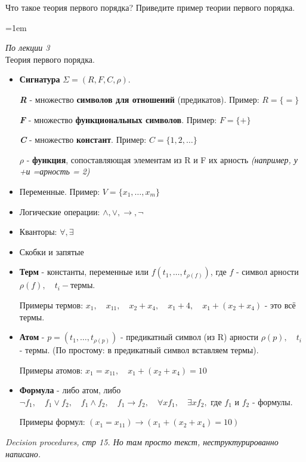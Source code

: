 \documentclass[12pt]{extreport}
\theoremstyle{definiton}
\theoremstyle{definition}
\theoremstyle{definition}
\newcommand{\solution}[2][\color{myblue}Ответ]{
\medskip
	\noindent{\bfseries #1 }{{\color{myblue}\bfseries #2:}}
}
\newenvironment{blockquote}{%
  \par%
  \medskip
  \leftskip=1em%
  \noindent}{%
  \par\medskip}
\begin{document}
\Pr[\textcolor{mygreen}{Каринэ, DONE}] Что такое теория первого порядка? Приведите пример теории первого порядка.
			
\solution{6}
\begin{blockquote}
{\color{myblue}
\textcolor{mypurpur}{\textit{По лекции 3}}\\

\noindent Теория первого порядка.
\begin{itemize}
    \item \textbf{Сигнатура} \(\Sigma=(R,F,C,\rho)\). \par
          \textbf{\textit{R}} - множество \textbf{символов для отношений} (предикатов). Пример: \(R=\{=\}\) \par
          \textbf{\textit{F}} - множество \textbf{функциональных символов}. Пример: \(F=\{+\}\) \par
          \textbf{\textit{C}} - множество \textbf{констант}. Пример: \(C=\{1,2,\dots\}\)\par
          \(\rho\) - \textbf{функция}, сопоставляющая элементам из R и F их арность \textit{(например, у \glqq+\grqq\quad и \glqq=\grqq\quad арность = 2)}
    \item Переменные. Пример: \(V=\{x_1,\dots,x_m\}\) 
    \item Логические операции: \(\wedge, \vee, \rightarrow, \neg \) 
    \item Кванторы: \(\forall, \exists\) 
    \item Скобки и запятые 
    \item \textbf{Терм} - константы, переменные или \(f(t_1, \dots, t_{\rho(f)})\), где \(f\) - символ арности \(\rho(f),  \quad t_i - \)термы. \par Примеры термов: \(x_1,\quad x_{11},\quad x_2+x_4, \quad x_1+4,\quad x_1+(x_2+x_4)\) - это всё термы.  
    \item \textbf{Атом} - \(p=(t_1, \dots, t_{\rho(p)})\) - предикатный символ (из R) арности \(\rho(p), \quad t_i\) - термы. (По простому: в предикатный символ вставляем термы). 
    \par Примеры атомов:
    \(x_1=x_{11}, \quad x_1+(x_2+x_4)=10\)
    \item \textbf{Формула} - либо атом, либо \(\neg f_1,\quad f_1\vee f_2, \quad f_1\wedge f_2, \quad f_1\rightarrow f_2, \quad \forall xf_1, \quad \exists xf_2,\) где \(f_1\text{ и } f_2\) - формулы. \par
    Примеры формул:
    \((x_1=x_{11})\rightarrow (x_1+(x_2+x_4)=10)\)
\end{itemize}   
\textcolor{mypurpur}{\textit{Decision procedures, стр 15. Но там просто текст, неструктурированно написано.}}\\

}
\end{blockquote}
\end{document}
